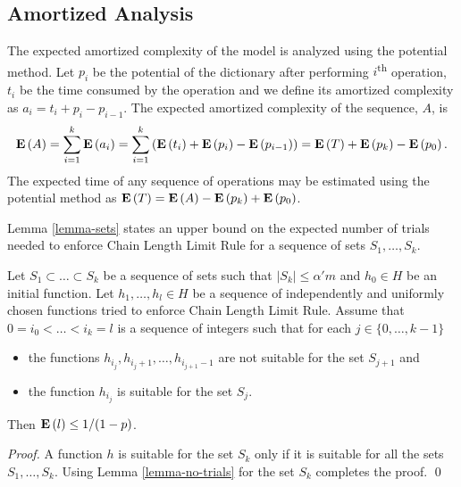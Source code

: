 \subsection{Amortized Analysis}

The expected amortized complexity of the model is analyzed using the potential method. Let $p_i$ be the potential of the dictionary after performing $i$\textsuperscript{th} operation, $t_i$ be the time consumed by the operation and we define its amortized complexity as $a_i = t_i + p_i - p_{i - 1}$. The expected amortized complexity of the sequence, $A$, is
\[
\mathbf{E}\left(A\right) = \sum_{i=1}^{k} \mathbf{E}\left(a_i\right) = \sum_{i = 1}^{k} \left(\mathbf{E}\left(t_i\right) + \mathbf{E}\left(p_i\right) - \mathbf{E}\left(p_{i - 1}\right)\right) = \mathbf{E}\left(T\right) + \mathbf{E}\left(p_k\right) - \mathbf{E}\left(p_0\right).
\]
The expected time of any sequence of operations may be estimated using the potential method as $\mathbf{E}\left(T\right) = \mathbf{E}\left(A\right) - \mathbf{E}\left(p_k\right) + \mathbf{E}\left(p_0\right)$.

Lemma \ref{lemma-sets} states an upper bound on the expected number of trials needed to enforce Chain Length Limit Rule for a sequence of sets $S_1, \dots, S_k$.
\begin{lemma}
\label{lemma-sets}
Let $S_1 \subset \dots \subset S_k$ be a sequence of sets such that $|S_k| \leq \alpha' m$ and $h_0 \in H$ be an initial function. Let $h_1, \dots, h_l \in H$ be a sequence of independently and uniformly chosen functions tried to enforce Chain Length Limit Rule. Assume that $0 = i_0 < \dots < i_k = l$ is a sequence of integers such that for each $j \in \{0, \dots, k - 1\}$
\begin{itemize}
\item the functions $h_{i_{j}}, h_{i_{j} + 1}, \dots, h_{i_{j + 1} - 1}$ are not suitable for the set $S_{j + 1}$ and 
\item the function $h_{i_{j}}$ is suitable for the set $S_j$.
\end{itemize}
Then $\mathbf{E}\left(l\right) \leq {1}/{(1 - p)}$.
\end{lemma}
\begin{proof}
A function $h$ is suitable for the set $S_k$ only if it is suitable for all the sets $S_1, \dots, S_k$. Using Lemma \ref{lemma-no-trials} for the set $S_k$ completes the proof.
\qed
\end{proof}

